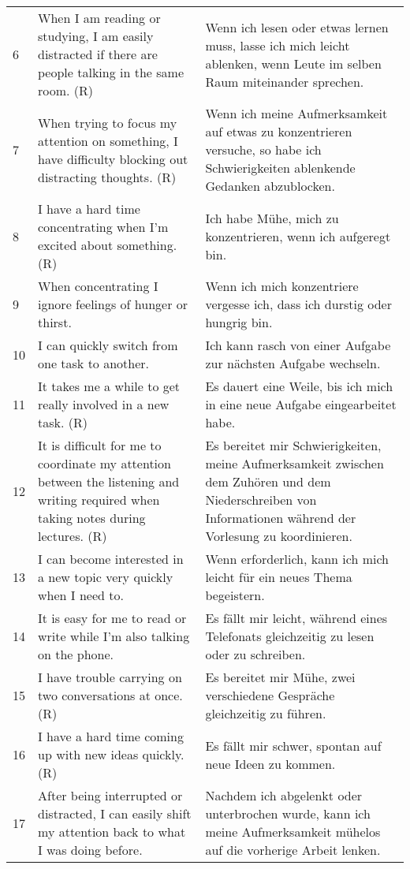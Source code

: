 \begin{center}
\begin{longtable}[t]{|l|p{6.6 cm}|p{6.6 cm}|}
        6 & When I am reading or studying, I am easily distracted if there are people talking in the same room. (R) & Wenn ich lesen oder etwas lernen muss, lasse ich mich leicht ablenken, wenn Leute im selben Raum miteinander sprechen. \\
        7 & When trying to focus my attention on something, I have difficulty blocking out distracting thoughts. (R) & Wenn ich meine Aufmerksamkeit auf etwas zu konzentrieren versuche, so habe ich Schwierigkeiten ablenkende Gedanken abzublocken. \\
        8 & I have a hard time concentrating when I’m excited about something. (R) & Ich habe Mühe, mich zu konzentrieren, wenn ich aufgeregt bin. \\
        9 & When concentrating I ignore feelings of hunger or thirst. & Wenn ich mich konzentriere vergesse ich, dass ich durstig oder hungrig bin. \\
        10 & I can quickly switch from one task to another. & Ich kann rasch von einer Aufgabe zur nächsten Aufgabe wechseln. \\
        11 & It takes me a while to get really involved in a new task. (R) & Es dauert eine Weile, bis ich mich in eine neue Aufgabe eingearbeitet habe. \\
        12 & It is difficult for me to coordinate my attention between the listening and writing required when taking notes during lectures. (R) & Es bereitet mir Schwierigkeiten, meine Aufmerksamkeit zwischen dem Zuhören und dem Niederschreiben von Informationen während der Vorlesung zu koordinieren. \\
        13 & I can become interested in a new topic very quickly when I need to. & Wenn erforderlich, kann ich mich leicht für ein neues Thema begeistern.  \\
        14 & It is easy for me to read or write while I’m also talking on the phone. & Es fällt mir leicht, während eines Telefonats gleichzeitig zu lesen oder zu schreiben.  \\
        15 & I have trouble carrying on two conversations at once. (R) & Es bereitet mir Mühe, zwei verschiedene Gespräche gleichzeitig zu führen. \\
        16 & I have a hard time coming up with new ideas quickly. (R) & Es fällt mir schwer, spontan auf neue Ideen zu kommen. \\
        17 & After being interrupted or distracted, I can easily shift my attention back to what I was doing before. & Nachdem ich abgelenkt oder unterbrochen wurde, kann ich meine Aufmerksamkeit mühelos auf die vorherige Arbeit lenken. \\

\end{longtable}
\end{center}
